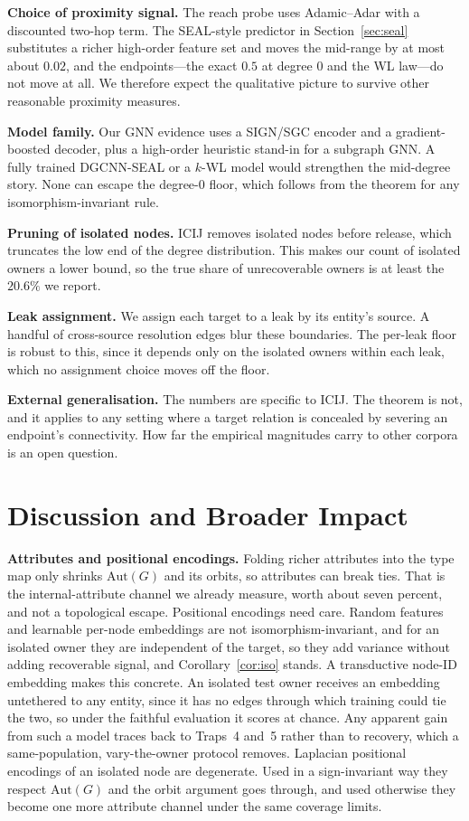 \documentclass[sigconf]{acmart}
\begin{document}
\textbf{Choice of proximity signal.} The reach probe uses Adamic--Adar with a
discounted two-hop term. The SEAL-style predictor in Section~\ref{sec:seal}
substitutes a richer high-order feature set and moves the mid-range by at most
about $0.02$, and the endpoints---the exact $0.5$ at degree $0$ and the WL
law---do not move at all. We therefore expect the qualitative picture to survive
other reasonable proximity measures.

\textbf{Model family.} Our GNN evidence uses a SIGN/SGC encoder and a
gradient-boosted decoder, plus a high-order heuristic stand-in for a subgraph GNN.
A fully trained DGCNN-SEAL or a $k$-WL model would strengthen the mid-degree
story. None can escape the degree-$0$ floor, which follows from the theorem for
any isomorphism-invariant rule.

\textbf{Pruning of isolated nodes.} ICIJ removes isolated nodes before release,
which truncates the low end of the degree distribution. This makes our count of
isolated owners a lower bound, so the true share of unrecoverable owners is at
least the $20.6\%$ we report.

\textbf{Leak assignment.} We assign each target to a leak by its entity's source.
A handful of cross-source resolution edges blur these boundaries. The per-leak
floor is robust to this, since it depends only on the isolated owners within each
leak, which no assignment choice moves off the floor.

\textbf{External generalisation.} The numbers are specific to ICIJ. The theorem
is not, and it applies to any setting where a target relation is concealed by
severing an endpoint's connectivity. How far the empirical magnitudes carry to
other corpora is an open question.

\section{Discussion and Broader Impact}\label{sec:disc}
\textbf{Attributes and positional encodings.} Folding richer attributes into the
type map only shrinks $\mathrm{Aut}(G)$ and its orbits, so attributes can break
ties. That is the internal-attribute channel we already measure, worth about seven
percent, and not a topological escape. Positional encodings need care. Random
features and learnable per-node embeddings are not isomorphism-invariant, and for
an isolated owner they are independent of the target, so they add variance without
adding recoverable signal, and Corollary~\ref{cor:iso} stands. A transductive
node-ID embedding makes this concrete. An isolated test owner receives an
embedding untethered to any entity, since it has no edges through which training
could tie the two, so under the faithful evaluation it scores at chance. Any
apparent gain from such a model traces back to Traps~4 and~5 rather than to
recovery, which a same-population, vary-the-owner protocol removes. Laplacian
positional encodings of an isolated node are degenerate. Used in a
sign-invariant way they respect $\mathrm{Aut}(G)$ and the orbit argument goes
through, and used otherwise they become one more attribute channel under the same
coverage limits.
\end{document}
